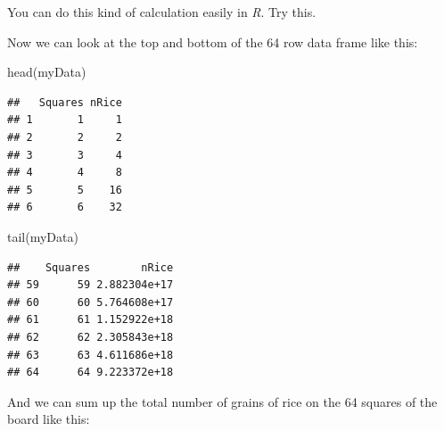 \documentclass[
  a4paper]{book}
\newenvironment{Shaded}{\begin{snugshade}}{\end{snugshade}}
\newcommand{\AttributeTok}[1]{\textcolor[rgb]{0.77,0.63,0.00}{#1}}
\newcommand{\ConstantTok}[1]{\textcolor[rgb]{0.00,0.00,0.00}{#1}}
\newcommand{\ControlFlowTok}[1]{\textcolor[rgb]{0.13,0.29,0.53}{\textbf{#1}}}
\newcommand{\DecValTok}[1]{\textcolor[rgb]{0.00,0.00,0.81}{#1}}
\newcommand{\FunctionTok}[1]{\textcolor[rgb]{0.00,0.00,0.00}{#1}}
\newcommand{\NormalTok}[1]{#1}
\newcommand{\OtherTok}[1]{\textcolor[rgb]{0.56,0.35,0.01}{#1}}
\newcommand{\SpecialCharTok}[1]{\textcolor[rgb]{0.00,0.00,0.00}{#1}}
\begin{document}
You can do this kind of calculation easily in \emph{R}. Try this.

\begin{Shaded}
\end{Shaded}

Now we can look at the top and bottom of the 64 row data frame like
this:

\begin{Shaded}
\begin{Highlighting}[]
\FunctionTok{head}\NormalTok{(myData)}
\end{Highlighting}
\end{Shaded}

\begin{verbatim}
##   Squares nRice
## 1       1     1
## 2       2     2
## 3       3     4
## 4       4     8
## 5       5    16
## 6       6    32
\end{verbatim}

\begin{Shaded}
\begin{Highlighting}[]
\FunctionTok{tail}\NormalTok{(myData)}
\end{Highlighting}
\end{Shaded}

\begin{verbatim}
##    Squares        nRice
## 59      59 2.882304e+17
## 60      60 5.764608e+17
## 61      61 1.152922e+18
## 62      62 2.305843e+18
## 63      63 4.611686e+18
## 64      64 9.223372e+18
\end{verbatim}

And we can sum up the total number of grains of rice on the 64 squares
of the board like this:

\begin{Shaded}
\end{Shaded}
\end{document}
